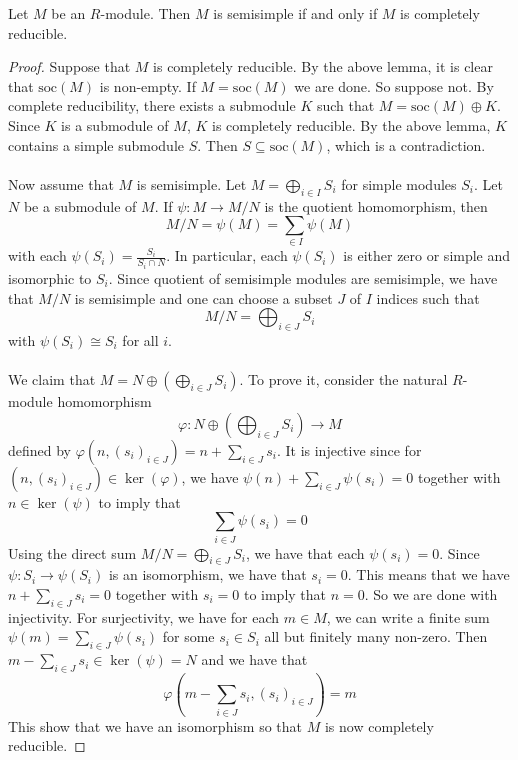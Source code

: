\documentclass[a4paper]{article}
\begin{document}
\begin{thm}{}{} Let $M$ be an $R$-module. Then $M$ is semisimple if and only if $M$ is completely reducible. \tcbline
\begin{proof}
Suppose that $M$ is completely reducible. By the above lemma, it is clear that $\text{soc}(M)$ is non-empty. If $M=\text{soc}(M)$ we are done. So suppose not. By complete reducibility, there exists a submodule $K$ such that $M=\text{soc}(M)\oplus K$. Since $K$ is a submodule of $M$, $K$ is completely reducible. By the above lemma, $K$ contains a simple submodule $S$. Then $S\subseteq\text{soc}(M)$, which is a contradiction. \\~\\

Now assume that $M$ is semisimple. Let $M=\bigoplus_{i\in I}S_i$ for simple modules $S_i$. Let $N$ be a submodule of $M$. If $\psi:M\to M/N$ is the quotient homomorphism, then $$M/N=\psi(M)=\sum_{\in I}\psi(M)$$ with each $\psi(S_i)=\frac{S_i}{S_i\cap N}$. In particular, each $\psi(S_i)$ is either zero or simple and isomorphic to $S_i$. Since quotient of semisimple modules are semisimple, we have that $M/N$ is semisimple and one can choose a subset $J$ of $I$ indices such that $$M/N=\bigoplus_{i\in J} S_i$$ with $\psi(S_i)\cong S_i$ for all $i$. \\~\\

We claim that $M=N\oplus\left(\bigoplus_{i\in J}S_i\right)$. To prove it, consider the natural $R$-module homomorphism $$\varphi:N\oplus\left(\bigoplus_{i\in J}S_i\right)\to M$$ defined by $\varphi(n,(s_i)_{i\in J})=n+\sum_{i\in J}s_i$. It is injective since for $(n,(s_i)_{i\in J})\in\ker(\varphi)$, we have $\psi(n)+\sum_{i\in J}\psi(s_i)=0$ together with $n\in\ker(\psi)$ to imply that $$\sum_{i\in J}\psi(s_i)=0$$ Using the direct sum $M/N=\bigoplus_{i\in J} S_i$, we have that each $\psi(s_i)=0$. Since $\psi:S_i\to\psi(S_i)$ is an isomorphism, we have that $s_i=0$. This means that we have $n+\sum_{i\in J}s_i=0$ together with $s_i=0$ to imply that $n=0$. So we are done with injectivity. For surjectivity, we have for each $m\in M$, we can write a finite sum $\psi(m)=\sum_{i\in J}\psi(s_i)$ for some $s_i\in S_i$ all but finitely many non-zero. Then $m-\sum_{i\in J}s_i\in\ker(\psi)=N$ and we have that $$\varphi\left(m-\sum_{i\in J}s_i,(s_i)_{i\in J}\right)=m$$ This show that we have an isomorphism so that $M$ is now completely reducible. 
\end{proof}
\end{thm}
\end{document}
